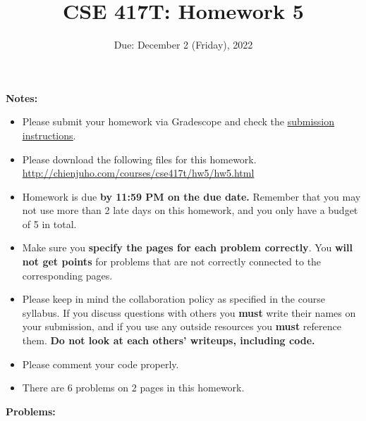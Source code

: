 \documentclass[11pt]{article}
\begin{document}
\title{CSE 417T: Homework 5}
\date{Due: December 2 (Friday), 2022}

\maketitle


\noindent \textbf{Notes: } 
\begin{itemize}

\item Please submit your homework via Gradescope and check the \href{http://chienjuho.com/courses/cse417t/hw_instructions.html}{\underline{submission instructions}}.

\item Please download the following files for this homework.\\
    \url{http://chienjuho.com/courses/cse417t/hw5/hw5.html}

\item Homework is due \textbf{by 11:59 PM on the due date.} Remember that
  you may not use more than 2 late days on this homework, and you
  only have a budget of 5 in total.

\item Make sure you \textbf{specify the pages for each problem correctly}. You \textbf{will not get points} for problems that are not correctly connected to the corresponding pages.

\item Please keep in mind the collaboration policy as specified in the
  course syllabus. If you discuss questions with 
others you \textbf{must} write their names on your submission, and if
you use any outside resources you \textbf{must} reference
them. \textbf{Do not look at each others' writeups, including code.}

\item Please comment your code properly.

\item There are 6 problems on 2 pages in this homework. 

\end{itemize}

\noindent \textbf{Problems:}
\end{document}
